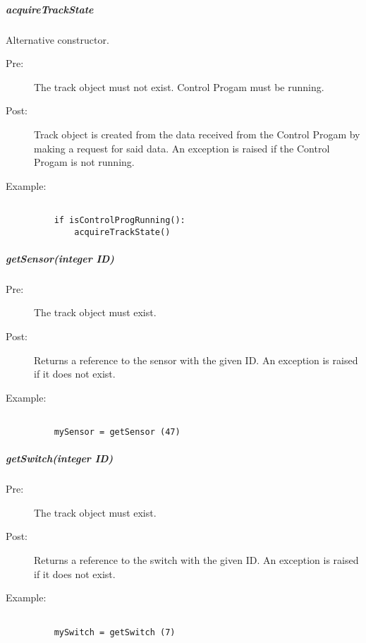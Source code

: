 \documentclass[a4paper,11pt,notitlepage]{article}
\def\CS{Control Progam\xspace} \def\LC{Local Copy of Train State\xspace} \def\TN{Track Node\xspace}
\begin{document}
\subparagraph{acquireTrackState} Alternative constructor.
\begin{description}
\item[\hspace{1cm}Pre:] The track object must not exist. \CS must be running.
\item[\hspace{1cm}Post:] Track object is created from the data received from the \CS by making a request for said data. An exception is raised if the \CS is not running.
\item[\hspace{1cm}Example:]
\begin{verbatim}

    if isControlProgRunning():
        acquireTrackState()
\end{verbatim}
\end{description}

\subparagraph{getSensor(integer ID)}
\begin{description}
\item[\hspace{1cm}Pre:] The track object must exist.
\item[\hspace{1cm}Post:] Returns a reference to the sensor with the given ID. An exception is raised if it does not exist.
\item[\hspace{1cm}Example:]
\begin{verbatim}

    mySensor = getSensor (47)
\end{verbatim}
\end{description}

\subparagraph{getSwitch(integer ID)}
\begin{description}
\item[\hspace{1cm}Pre:] The track object must exist.
\item[\hspace{1cm}Post:] Returns a reference to the switch with the given ID. An exception is raised if it does not exist.
\item[\hspace{1cm}Example:]
\begin{verbatim}

    mySwitch = getSwitch (7)
\end{verbatim}
\end{description}

%    
\end{document}

